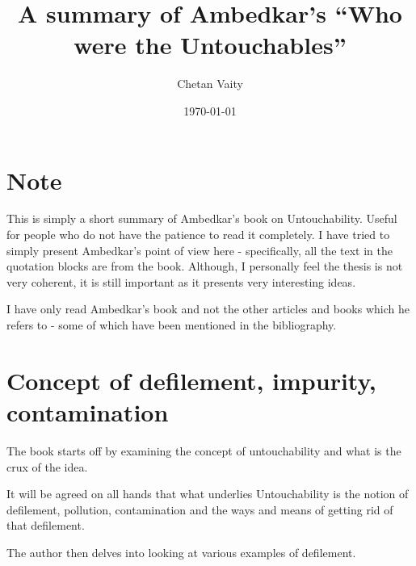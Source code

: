 \documentclass{article}
\begin{document}
\title{A summary of Ambedkar's ``Who were the Untouchables''}
\author{Chetan Vaity}
\date{\today}
\maketitle

\section{Note}
This is simply a short summary of Ambedkar's book on Untouchability\cite{ambedkar1}. Useful for people who do not have the patience to read it completely. I have tried to simply present Ambedkar's point of view here - specifically, all the text in the quotation blocks are from the book. Although, I personally feel the thesis is not very coherent, it is still important as it presents very interesting ideas.

I have only read Ambedkar's book and not the other articles and books which he refers to - some of which have been mentioned in the bibliography.

\section{Concept of defilement, impurity, contamination}

The book starts off by examining the concept of untouchability and what is the crux of the idea.

\begin{shadequote}
It will be agreed on all hands that what underlies Untouchability is the notion of defilement, pollution, contamination and the ways and means of getting rid of that defilement.
\end{shadequote}

The author then delves into looking at various examples of defilement.
\end{document}
